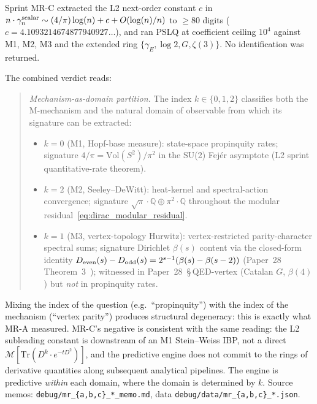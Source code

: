 \documentclass[aps,pra,twocolumn,superscriptaddress,longbibliography]{revtex4-2}
\begin{document}
Sprint MR-C extracted the L2 next-order constant $c$ in
$n \cdot \gamma_n^{\rm scalar} \sim (4/\pi)\log(n) + c + O(\log(n)/n)$
to $\geq 80$ digits ($c = 4.1093214674877940927\ldots$), and ran PSLQ
at coefficient ceiling $10^4$ against M1, M2, M3 and the extended
ring $\{\gamma_E, \log 2, G, \zeta(3)\}$. No identification was
returned.

The combined verdict reads:

\begin{quote}
\textit{Mechanism-as-domain partition.}
The index $k \in \{0, 1, 2\}$ classifies both the M-mechanism and
the natural domain of observable from which its signature can be
extracted:
\begin{itemize}
  \item $k = 0$ (M1, Hopf-base measure): state-space propinquity rates;
    signature $4/\pi = \mathrm{Vol}(S^2)/\pi^2$ in the SU(2) Fej{\'e}r
    asymptote (L2 sprint quantitative-rate theorem).
  \item $k = 2$ (M2, Seeley--DeWitt): heat-kernel and spectral-action
    convergence; signature $\sqrt{\pi}\cdot\mathbb{Q} \oplus \pi^2 \cdot \mathbb{Q}$
    throughout the modular residual~\eqref{eq:dirac_modular_residual}.
  \item $k = 1$ (M3, vertex-topology Hurwitz): vertex-restricted
    parity-character spectral sums; signature Dirichlet $\beta(s)$
    content via the closed-form identity
    $D_{\rm even}(s) - D_{\rm odd}(s) = 2^{s-1}(\beta(s) - \beta(s-2))$
    (Paper~28 Theorem~3~\cite{loutey_paper28}); witnessed in
    Paper~28~\S\,QED-vertex (Catalan $G$, $\beta(4)$) but \emph{not} in
    propinquity rates.
\end{itemize}
\end{quote}

Mixing the index of the question (e.g.\ ``propinquity'') with the
index of the mechanism (``vertex parity'') produces structural
degeneracy: this is exactly what MR-A measured. MR-C's negative is
consistent with the same reading: the L2 subleading constant is
downstream of an M1 Stein--Weiss IBP, not a direct
$\mathcal{M}[\mathrm{Tr}(D^k \cdot e^{-tD^2})]$, and the predictive
engine does not commit to the rings of derivative quantities along
subsequent analytical pipelines. The engine is predictive
\emph{within} each domain, where the domain is determined by $k$.
Source memos: \texttt{debug/mr\_\{a,b,c\}\_*\_memo.md}, data
\texttt{debug/data/mr\_\{a,b,c\}\_*.json}.
\end{document}
